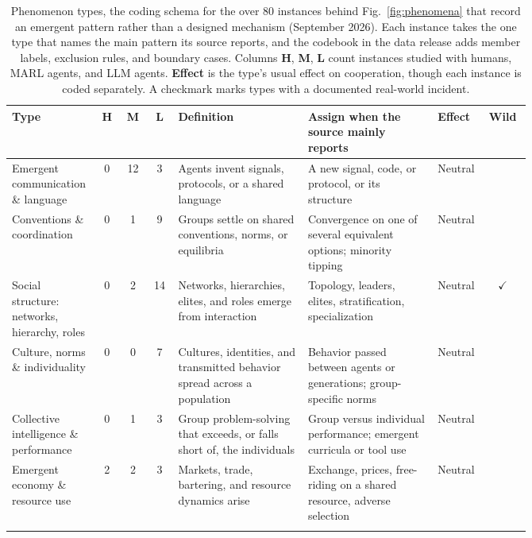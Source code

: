 \documentclass[runningheads]{llncs}
\newcommand{\rowline}{\arrayrulecolor{black!22}\specialrule{0.4pt}{2pt}{2pt}\arrayrulecolor{black}}
\begin{document}
\begin{table}[!tbp]
\centering
\caption{Phenomenon types, the coding schema for the over 80 instances behind Fig.~\mbox{\ref{fig:phenomena}} that record an emergent pattern rather than a designed mechanism (September 2026). Each instance takes the one type that names the main pattern its source reports, and the codebook in the data release adds member labels, exclusion rules, and boundary cases. Columns \textbf{H}, \textbf{M}, \textbf{L} count instances studied with humans, MARL agents, and LLM agents. \textbf{Effect} is the type's usual effect on cooperation, though each instance is coded separately. A checkmark marks types with a documented real-world incident.}
\label{tab:phenomena}
\scriptsize
\renewcommand{\arraystretch}{1.05}
\setlength{\tabcolsep}{3pt}
\begin{tabular}{@{}>{\raggedright\arraybackslash}p{0.17\linewidth} c c c >{\raggedright\arraybackslash}p{0.255\linewidth} >{\raggedright\arraybackslash}p{0.255\linewidth} >{\raggedright\arraybackslash}p{0.075\linewidth} c@{}}
\toprule
\textbf{Type} & \textbf{H} & \textbf{M} & \textbf{L} & \textbf{Definition} & \textbf{Assign when the source mainly reports} & \textbf{Effect} & \textbf{Wild} \\
\midrule
Emergent communication \& language & 0 & 12 & 3 & Agents invent signals, protocols, or a shared language & A new signal, code, or protocol, or its structure & Neutral &  \\ \rowline
Conventions \& coordination & 0 & 1 & 9 & Groups settle on shared conventions, norms, or equilibria & Convergence on one of several equivalent options; minority tipping & Neutral &  \\ \rowline
Social structure: networks, hierarchy, roles & 0 & 2 & 14 & Networks, hierarchies, elites, and roles emerge from interaction & Topology, leaders, elites, stratification, specialization & Neutral & $\checkmark$ \\ \rowline
Culture, norms \& individuality & 0 & 0 & 7 & Cultures, identities, and transmitted behavior spread across a population & Behavior passed between agents or generations; group-specific norms & Neutral &  \\ \rowline
Collective intelligence \& performance & 0 & 1 & 3 & Group problem-solving that exceeds, or falls short of, the individuals & Group versus individual performance; emergent curricula or tool use & Neutral &  \\ \rowline
Emergent economy \& resource use & 2 & 2 & 3 & Markets, trade, bartering, and resource dynamics arise & Exchange, prices, free-riding on a shared resource, adverse selection & Neutral &  \\ \rowline

\end{tabular}
\end{table}
\end{document}
